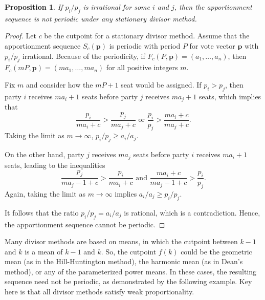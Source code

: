 \documentclass[pdflatex,sn-mathphys-num]{sn-jnl}
\theoremstyle{thmstyleone}%
\newtheorem{proposition}{Proposition}%
\theoremstyle{thmstyletwo}%
\theoremstyle{thmstylethree}%
\begin{document}
\begin{proposition}
If $p_i/p_j$ is irrational for some $i$ and $j$, then the apportionment sequence is not periodic under any stationary divisor method. 
\end{proposition}
\begin{proof}
Let $c$ be the cutpoint for a stationary divisor method.  Assume that the apportionment sequence $S_c(\mathbf p)$ is periodic with period $P$ for vote vector $\mathbf p$ with $p_i/p_j$ irrational.  Because of the periodicity, if $F_c(P, \mathbf p) = (a_1, \dots, a_n)$, then $F_c(mP, \mathbf p) = (ma_1, \ldots, ma_n)$ for all positive integers $m$. 

Fix $m$  and consider how the $mP+1$ seat would be assigned. If $p_i > p_j$, then party $i$ receives $ma_i + 1$ seats before party $j$ receives $m a_j + 1$ seats, which implies that 
$$\frac{p_i}{ma_i + c} > \frac{p_j}{ma_j  + c} \text{ or }\frac{p_i}{p_j} > \frac{ma_i + c}{ma_j + c}.$$
Taking the limit as $m \rightarrow \infty$, $p_i/p_j \ge a_i/a_j$.

On the other hand, party $j$ receives $ma_j$ seats before party $i$ receives $ma_i + 1$ seats, leading to the inequalities
$$\frac{p_j}{ma_j -1 + c} > \frac{p_i}{ma_i + c} \text{ and } \frac{ma_i + c}{ma_j -1 + c} > \frac{p_i}{p_j}.$$ Again, taking the limit as $m \rightarrow \infty$ implies $a_i/a_j \ge p_i/p_j$. 

It follows that the ratio $p_i/p_j = a_i/a_j$ is rational, which is a contradiction.  Hence, the apportionment sequence cannot be periodic. \end{proof}

Many divisor methods are based on means, in which the cutpoint between $k-1$ and $k$ is a mean of $k-1$ and $k$.  So, the cutpoint $f(k)$ could be the geometric mean (as in the Hill-Huntington method), the harmonic mean (as in Dean's method), or any of the parameterized power means.  In these cases, the resulting sequence need not be periodic, as demonstrated by the following example. Key here is that all divisor methods satisfy weak proportionality.
\end{document}
